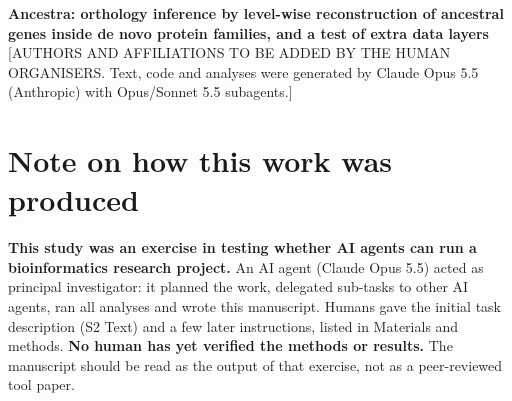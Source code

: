 \newif\ifembedfigs \embedfigstrue %
\newcommand{\pend}[1]{\textbf{[PENDING: #1]}}
\newcommand{\CI}[2]{[#1,\,#2]}


\vspace*{0.2in}

\begin{flushleft}
{\Large
\textbf{Ancestra: orthology inference by level-wise reconstruction of ancestral genes inside de novo protein families, and a test of extra data layers}
}
\newline
\\
{}[AUTHORS AND AFFILIATIONS TO BE ADDED BY THE HUMAN ORGANISERS. Text, code and analyses were generated by Claude Opus 5.5 (Anthropic) with Opus/Sonnet 5.5 subagents.]
\end{flushleft}

\section*{Note on how this work was produced}
\textbf{This study was an exercise in testing whether AI agents can run a bioinformatics research project.} An AI agent (Claude Opus 5.5) acted as principal investigator: it planned the work, delegated sub-tasks to other AI agents, ran all analyses and wrote this manuscript. Humans gave the initial task description (S2 Text) and a few later instructions, listed in Materials and methods. \textbf{No human has yet verified the methods or results.} The manuscript should be read as the output of that exercise, not as a peer-reviewed tool paper.

